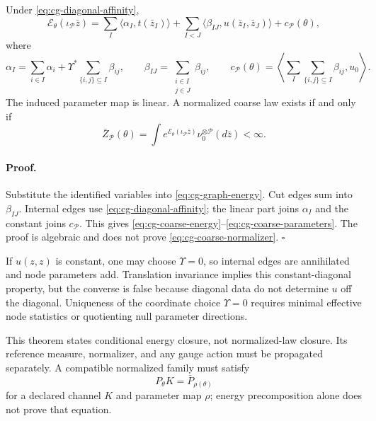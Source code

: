 Under \eqref{eq:cg-diagonal-affinity},
\begin{equation}
\mathcal E_\theta(\iota_{\mathcal P}\bar z)
=\sum_I\langle\alpha_I,t(\bar z_I)\rangle
+\sum_{I<J}\langle\beta_{IJ},u(\bar z_I,\bar z_J)\rangle
+c_{\mathcal P}(\theta),
\label{eq:cg-coarse-energy}
\end{equation}
where
\begin{equation}
\alpha_I=\sum_{i\in I}\alpha_i
+\Upsilon^\ast\sum_{\{i,j\}\subseteq I}\beta_{ij},
\qquad
\beta_{IJ}=\sum_{\substack{i\in I\\j\in J}}\beta_{ij},
\qquad
c_{\mathcal P}(\theta)
=\left\langle\sum_I\sum_{\{i,j\}\subseteq I}\beta_{ij},u_0\right\rangle .
\label{eq:cg-coarse-parameters}
\end{equation}
The induced parameter map is linear. A normalized coarse law exists if and
only if
\begin{equation}
\bar Z_{\mathcal P}(\theta)
=\int e^{\mathcal E_\theta(\iota_{\mathcal P}\bar z)}
\nu_0^{\otimes\mathcal P}(d\bar z)<\infty.
\label{eq:cg-coarse-normalizer}
\end{equation}

\paragraph{Proof.}
Substitute the identified variables into \eqref{eq:cg-graph-energy}. Cut
edges sum into \(\beta_{IJ}\). Internal edges use
\eqref{eq:cg-diagonal-affinity}; the linear part joins \(\alpha_I\) and the
constant joins \(c_{\mathcal P}\). This gives
\eqref{eq:cg-coarse-energy}--\eqref{eq:cg-coarse-parameters}. The proof is
algebraic and does not prove \eqref{eq:cg-coarse-normalizer}. \(\square\)

If \(u(z,z)\) is constant, one may choose \(\Upsilon=0\), so internal edges
are annihilated and node parameters add. Translation invariance implies this
constant-diagonal property, but the converse is false because diagonal data
do not determine \(u\) off the diagonal. Uniqueness of the coordinate choice
\(\Upsilon=0\) requires minimal effective node statistics or quotienting
null parameter directions. 

This theorem states conditional energy closure, not normalized-law closure.
Its reference measure, normalizer, and any gauge action must be propagated
separately. A compatible normalized family must satisfy
\[
P_\theta K=\bar P_{\rho(\theta)}
\]
for a declared channel \(K\) and parameter map \(\rho\); energy
precomposition alone does not prove that equation. 

